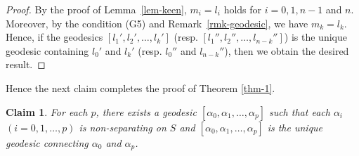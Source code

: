 \documentclass[]{aspm}
\newtheorem{claim}[definition]{Claim}
\begin{document}
\begin{proof}
By the proof of Lemma~\ref{lem-keen}, $m_i=l_i$ holds for $i=0,1,n-1$ and $n$.
Moreover, by the condition (G5) and Remark~\ref{rmk-geodesic}, we have $m_k=l_k$.
Hence, if the geodesics $[l_1',l_2',\dots,l_k']$ (resp. $[l_1'',l_2'',\dots,l_{n-k}'']$) is the unique geodesic containing $l_0'$ and $l_k'$ (resp. $l_0''$ and $l_{n-k}''$), then we obtain the desired result.
\end{proof}


Hence the next claim completes the proof of Theorem \ref{thm-1}. 

\begin{claim}\label{sequence}
For each $p$, there exists a geodesic $[\alpha_0,\alpha_1,\dots, \alpha_p]$ such that each $\alpha_i$ $(i=0,1,\dots,p)$ is non-separating on $S$ and $[\alpha_0,\alpha_1,\dots, \alpha_p]$ is the unique geodesic connecting $\alpha_0$ and $\alpha_p$.
\end{claim}
\end{document}
